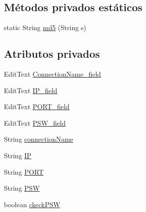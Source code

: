 \subsection*{Métodos privados estáticos}
\begin{DoxyCompactItemize}
\item 
static String \hyperlink{classes_1_1ucm_1_1tfg_1_1controlremotolinux_1_1client_1_1controller_1_1NewConnectionActivity_aaf0c70af73614bfd4c4a156407d53ef4}{md5} (String s)
\end{DoxyCompactItemize}
\subsection*{Atributos privados}
\begin{DoxyCompactItemize}
\item 
Edit\-Text \hyperlink{classes_1_1ucm_1_1tfg_1_1controlremotolinux_1_1client_1_1controller_1_1NewConnectionActivity_aefa6cbc06ef7ed6c09583aac36a10a5d}{Connection\-Name\-\_\-field}
\item 
Edit\-Text \hyperlink{classes_1_1ucm_1_1tfg_1_1controlremotolinux_1_1client_1_1controller_1_1NewConnectionActivity_aaac9f6ca3ff657f84a9e1fdad2992958}{I\-P\-\_\-field}
\item 
Edit\-Text \hyperlink{classes_1_1ucm_1_1tfg_1_1controlremotolinux_1_1client_1_1controller_1_1NewConnectionActivity_abe571af8247d1ef78a0c0ed5edaf3308}{P\-O\-R\-T\-\_\-field}
\item 
Edit\-Text \hyperlink{classes_1_1ucm_1_1tfg_1_1controlremotolinux_1_1client_1_1controller_1_1NewConnectionActivity_a243da6d30e610fd51b6b878dce2acc7c}{P\-S\-W\-\_\-field}
\item 
String \hyperlink{classes_1_1ucm_1_1tfg_1_1controlremotolinux_1_1client_1_1controller_1_1NewConnectionActivity_a3f3c0694b43f637393da1de941c00fa1}{connection\-Name}
\item 
String \hyperlink{classes_1_1ucm_1_1tfg_1_1controlremotolinux_1_1client_1_1controller_1_1NewConnectionActivity_a6f16e095078c88a12c58b2e9c949e0a7}{I\-P}
\item 
String \hyperlink{classes_1_1ucm_1_1tfg_1_1controlremotolinux_1_1client_1_1controller_1_1NewConnectionActivity_a28de48a3f946023e08bae98f988b16a9}{P\-O\-R\-T}
\item 
String \hyperlink{classes_1_1ucm_1_1tfg_1_1controlremotolinux_1_1client_1_1controller_1_1NewConnectionActivity_aa82f9264c686d25759da2e6531a95603}{P\-S\-W}
\item 
boolean \hyperlink{classes_1_1ucm_1_1tfg_1_1controlremotolinux_1_1client_1_1controller_1_1NewConnectionActivity_aa1ea973b1f2b0da31f7d62ba058556d1}{ckeck\-P\-S\-W}
\end{DoxyCompactItemize}


